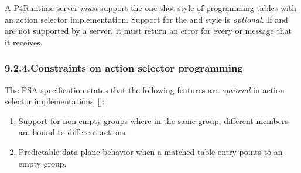 \documentclass[11pt]{article}
\begin{document}
{%
A P4Runtime server \emph{must} support the one shot style of programming tables with
an action selector implementation. Support for the  and
 style is \emph{optional}.  If  and
 are not supported by a server, it must return an
 error for every  or 
message that it receives.%

\subsubsection{9.2.4.\hspace*{0.5em}Constraints on action selector programming}\label{action-selector-constraints}%

\noindent{}The PSA specification states that the following features are \emph{optional} in
action selector implementations~[]:%

\begin{enumerate}[noitemsep,topsep=\mdcompacttopsep]%

\item{}Support for non-empty groups where in the same group, different members are
bound to different actions.%

\item{}Predictable data plane behavior when a matched table entry points to an empty
group.%
\end{enumerate}%

}
\end{document}
